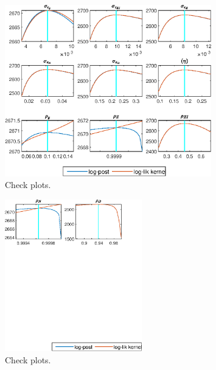  
\begin{figure}[H]
\centering 
\includegraphics[width=0.80\textwidth]{BRS_growth_sep/graphs/BRS_growth_sep_CheckPlots1}
\caption{Check plots.}\label{Fig:CheckPlots:1}
\end{figure}
 
\begin{figure}[H]
\centering 
\includegraphics[width=0.53\textwidth]{BRS_growth_sep/graphs/BRS_growth_sep_CheckPlots2}
\caption{Check plots.}\label{Fig:CheckPlots:2}
\end{figure}
 
